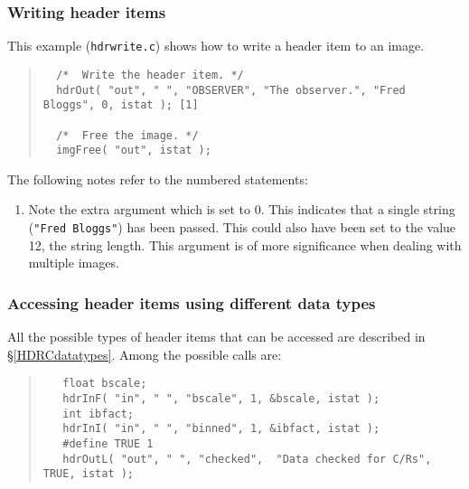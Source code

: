 \documentclass[twoside,11pt]{article}
\newcommand{\htmladdnormallink}[2]{#1}
\newcommand{\hyperref}[4]{#2\ref{#4}#3}
\renewcommand{\_}{\texttt{\symbol{95}}}
\newcommand{\myverb}[1]{{\texttt{#1}}}
\newcommand{\mynote}{The following notes refer to the numbered statements:}
\newenvironment{code}{\begin{small} \begin{quote}}
                     {\end{quote} \end{small}}
\newenvironment{enumnotes}
{
   \renewcommand{\labelenumi}{\myverb{[\theenumi]}}
   \begin{enumerate}
}{
   \end{enumerate}
   \renewcommand{\labelenumi}{\theenumi}
}
\renewenvironment{enumnotes}
  {
    \begin{enumerate}
  }{
    \end{enumerate}
  }
\begin{document}
\subsubsection{Writing header items}
This example
(\htmladdnormallink{\myverb{hdrwrite.c}}{../../bin/examples/img/hdrwrite.c})
shows how to write a header item to an image.
\begin{code}
\begin{verbatim}
  /*  Write the header item. */
  hdrOut( "out", " ", "OBSERVER", "The observer.", "Fred Bloggs", 0, istat ); [1]

  /*  Free the image. */
  imgFree( "out", istat );
\end{verbatim}
\end{code}
\mynote
\begin{enumnotes}
\item Note the extra argument which is set to 0. This indicates that a
single string (\myverb{"Fred Bloggs"}) has been passed. This could also
have been set to the value 12, the string length. This argument is of
more significance when dealing with multiple images.
\end{enumnotes}

\subsubsection{Accessing header items using different data types}
All the possible types of header items that can be accessed are
described \hyperref{here}{in \S}{}{HDRCdatatypes}. Among the
possible calls are:
\begin{code}
\begin{verbatim}
   float bscale;
   hdrInF( "in", " ", "bscale", 1, &bscale, istat );
   int ibfact;
   hdrInI( "in", " ", "binned", 1, &ibfact, istat );
   #define TRUE 1
   hdrOutL( "out", " ", "checked",  "Data checked for C/Rs", TRUE, istat );
\end{verbatim}
\end{code}
\end{document}
